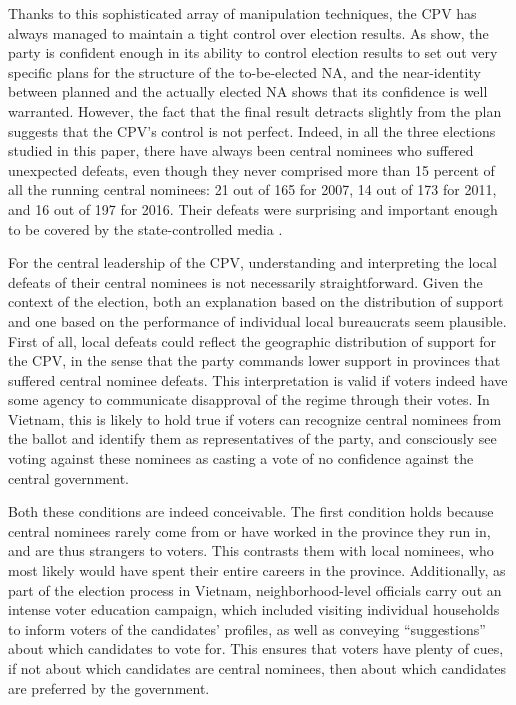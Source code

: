 \documentclass[12pt]{article}\usepackage[]{graphicx}\usepackage[]{color}
\newcommand{\1}{\mathbbm{1}}
\begin{document}
Thanks to this sophisticated array of manipulation techniques, the CPV has always managed to maintain a tight control over election results. As \cite{MaleskySchuler2011} show, the party is confident enough in its ability to control election results to set out very specific plans for the structure of the to-be-elected NA, and the near-identity between planned and the actually elected NA shows that its confidence is well warranted. However, the fact that the final result detracts slightly from the plan suggests that the CPV's control is not perfect. Indeed, in all the three elections studied in this paper, there have always been central nominees who suffered unexpected defeats, even though they never comprised more than 15 percent of all the running central nominees: 21 out of 165 for 2007, 14 out of 173 for 2011, and 16 out of 197 for 2016. Their defeats were surprising and important enough to be covered by the state-controlled media \citep[e.g][]{vov2016, laodong2016}.

For the central leadership of the CPV, understanding and interpreting the local defeats of their central nominees is not necessarily straightforward. Given the context of the election, both an explanation based on the distribution of support and one based on the performance of individual local bureaucrats seem plausible. First of all, local defeats could reflect the geographic distribution of support for the CPV, in the sense that the party commands lower support in provinces that suffered central nominee defeats. This interpretation is valid if voters indeed have some agency to communicate disapproval of the regime through their votes. In Vietnam, this is likely to hold true if voters can recognize central nominees from the ballot and identify them as representatives of the party, and consciously see voting against these nominees as casting a vote of no confidence against the central government. 

Both these conditions are indeed conceivable. The first condition holds because central nominees rarely come from or have worked in the province they run in, and are thus strangers to voters. This contrasts them with local nominees, who most likely would have spent their entire careers in the province. Additionally, as part of the election process in Vietnam, neighborhood-level officials carry out an intense voter education campaign, which included visiting individual households to inform voters of the candidates' profiles, as well as conveying ``suggestions'' about which candidates to vote for. This ensures that voters have plenty of cues, if not about which candidates are central nominees, then about which candidates are preferred by the government. 
\end{document}
